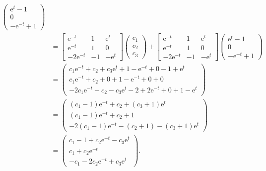 \documentclass[12pt,UTF8]{ctexart}
\newcommand{\me}[0]{\mathrm e}
\begin{document}
\begin{enumerate}
\[\begin{aligned}
\begin{pmatrix}
\me^t-1\\0\\-\me^{-t}+1
\end{pmatrix}\\
&=\begin{bmatrix}
\me^{-t}&1&\me^t\\\me^{-t}&1&0\\-2\me^{-t}&-1&-\me^t
\end{bmatrix}\begin{pmatrix}c_1\\c_2\\c_3\end{pmatrix}+\begin{bmatrix}
\me^{-t}&1&\me^t\\\me^{-t}&1&0\\-2\me^{-t}&-1&-\me^t
\end{bmatrix}\begin{pmatrix}
\me^t-1\\0\\-\me^{-t}+1
\end{pmatrix}\\
&=\begin{pmatrix}
c_1\me^{-t}+c_2+c_3\me^t+1-\me^{-t}+0-1+\me^t\\
c_1\me^{-t}+c_2+0+1-\me^{-t}+0+0\\
-2c_1\me^{-t}-c_2-c_3\me^t-2+2\me^{-t}+0+1-\me^t
\end{pmatrix}\\
&=\begin{pmatrix}
(c_1-1)\me^{-t}+c_2+(c_3+1)\me^t\\
(c_1-1)\me^{-t}+c_2+1\\
-2(c_1-1)\me^{-t}-(c_2+1)-(c_3+1)\me^t
\end{pmatrix}\\
&=\begin{pmatrix}
c_1-1+c_2\me^{-t}-c_3\me^t\\
c_1+c_2\me^{-t}\\
-c_1-2c_2\me^{-t}+c_3\me^t
\end{pmatrix}.
\end{aligned}\]


\end{enumerate}
\end{document}
